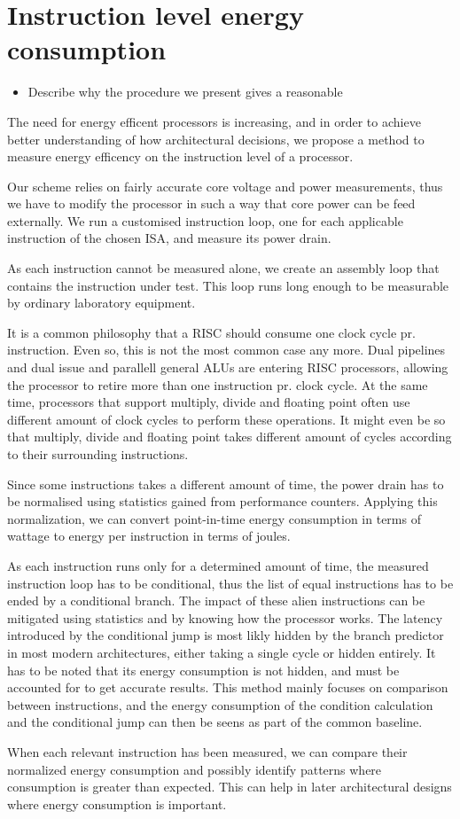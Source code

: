 \section{Instruction level energy consumption} 

\begin{itemize} \item Describe why the procedure we present gives a reasonable
    \end{itemize}


The need for energy efficent processors is increasing, and in order to achieve
better understanding of how architectural decisions, we propose a method to
measure energy efficency on the instruction level of a processor.

Our scheme relies on fairly accurate core voltage and power measurements, thus
we have to modify the processor in such a way that core power can be feed
externally.  We run a customised instruction loop, one for each applicable
instruction of the chosen ISA, and measure its power drain.

As each instruction cannot be measured alone, we create an assembly loop that
contains the instruction under test. This loop runs long enough to be measurable
by ordinary laboratory equipment.

It is a common philosophy that a RISC should consume one clock cycle pr.
instruction\cite{sivarama}. Even so, this is not the most common case any more.
Dual pipelines and dual issue and parallell general ALUs are entering RISC
processors, allowing the processor to retire more than one instruction pr. clock
cycle. At the same time, processors that support multiply, divide and floating
point often use different amount of clock cycles to perform these operations. It
might even be so that multiply, divide and floating point takes different amount
of cycles according to their surrounding instructions.

Since some instructions takes a different amount of time, the power drain has to be
normalised using statistics gained from performance counters. Applying this
normalization, we can convert point-in-time energy consumption in terms of
wattage to energy per instruction in terms of joules.

As each instruction runs only for a determined amount of time, the measured
instruction loop has to be conditional, thus the list of equal instructions has
to be ended by a conditional branch. The impact of these alien instructions 
can be mitigated using statistics and by knowing how the processor works. The
latency introduced by the conditional jump is most likly hidden by the branch
predictor in most modern architectures, either taking a single cycle or hidden
entirely. It has to be noted that its energy consumption is not hidden, and must
be accounted for to get accurate results. This method mainly focuses on
comparison between instructions, and the energy consumption of the condition
calculation and the conditional jump can then be seens as part of the common
baseline.

When each relevant instruction has been measured, we can compare their
normalized energy consumption and possibly identify patterns where consumption
is greater than expected. This can help in later architectural designs where
energy consumption is important.


